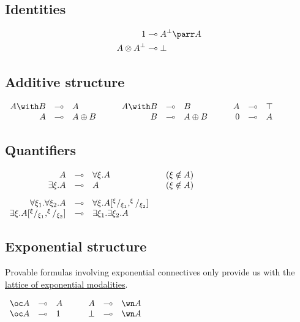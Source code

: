 \subsection{Identities}\label{identities}
\begin{align*}
\one &\limp A\orth\parr A \\
A\tens A\orth &\limp\bot
\end{align*}

\subsection{Additive structure}\label{additive-structure}

\(\begin{array}{rclcrclcrcl}
  A\with B & \limp&  A & \quad&  A\with B & \limp&  B & \quad&  A & \limp&  \top\\
  A & \limp&  A\plus B & \quad&  B & \limp&  A\plus B & \quad&  \zero & \limp&  A
\end{array}\)

\subsection{Quantifiers}\label{quantifiers-2}

\(\begin{array}{rcll}
  A & \multimap&  \forall \xi.A  & \quad  (\xi\notin A) \\
  \exists \xi.A & \multimap&  A  & \quad  (\xi\notin A) \\[2ex]
  \forall \xi_1.\forall \xi_2. A & \multimap&  \forall \xi. A[^\xi/_{\xi_1},^\xi/_{\xi_2}] \\
  \exists \xi.A[^\xi/_{\xi_1},^\xi/_{\xi_2}] & \multimap&  \exists \xi_1. \exists \xi_2.A
\end{array}\)

\subsection{Exponential structure}\label{exponential-structure}

Provable formulas involving exponential connectives only provide us with
the \hyperref[lattice-of-exponential-modalities]{lattice of exponential modalities}.

\(\begin{array}{rclcrcl}
  \oc A & \limp&  A & \quad&  A& \limp& \wn A\\
  \oc A & \limp&  1 & \quad&  \bot & \limp&  \wn A
\end{array}\)

